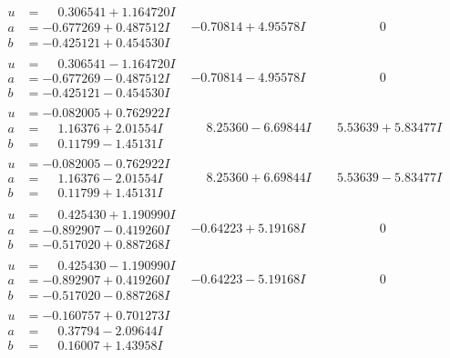 \documentclass[1p]{elsarticle_modified}
\theoremstyle{definition}
\begin{document}
$$\begin{array}{c|c|c}
\begin{aligned}
u &= \phantom{-}0.306541 + 1.164720 I \\
a &= -0.677269 + 0.487512 I \\
b &= -0.425121 + 0.454530 I\end{aligned}
 & -0.70814 + 4.95578 I & \phantom{-0.000000 } 0 \\ \hline\begin{aligned}
u &= \phantom{-}0.306541 - 1.164720 I \\
a &= -0.677269 - 0.487512 I \\
b &= -0.425121 - 0.454530 I\end{aligned}
 & -0.70814 - 4.95578 I & \phantom{-0.000000 } 0 \\ \hline\begin{aligned}
u &= -0.082005 + 0.762922 I \\
a &= \phantom{-}1.16376 + 2.01554 I \\
b &= \phantom{-}0.11799 - 1.45131 I\end{aligned}
 & \phantom{-}8.25360 - 6.69844 I & \phantom{-}5.53639 + 5.83477 I \\ \hline\begin{aligned}
u &= -0.082005 - 0.762922 I \\
a &= \phantom{-}1.16376 - 2.01554 I \\
b &= \phantom{-}0.11799 + 1.45131 I\end{aligned}
 & \phantom{-}8.25360 + 6.69844 I & \phantom{-}5.53639 - 5.83477 I \\ \hline\begin{aligned}
u &= \phantom{-}0.425430 + 1.190990 I \\
a &= -0.892907 - 0.419260 I \\
b &= -0.517020 + 0.887268 I\end{aligned}
 & -0.64223 + 5.19168 I & \phantom{-0.000000 } 0 \\ \hline\begin{aligned}
u &= \phantom{-}0.425430 - 1.190990 I \\
a &= -0.892907 + 0.419260 I \\
b &= -0.517020 - 0.887268 I\end{aligned}
 & -0.64223 - 5.19168 I & \phantom{-0.000000 } 0 \\ \hline\begin{aligned}
u &= -0.160757 + 0.701273 I \\
a &= \phantom{-}0.37794 - 2.09644 I \\
b &= \phantom{-}0.16007 + 1.43958 I\end{aligned}

\end{array}$$
\end{document}
